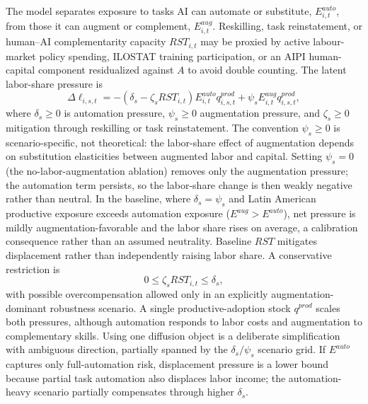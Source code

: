 \documentclass[11pt,a4paper]{article}
\begin{document}
The model separates exposure to tasks AI can automate or substitute, $E^{auto}_{i,t}$, from those it can augment or complement, $E^{aug}_{i,t}$. Reskilling, task reinstatement, or human--AI complementarity capacity $RST_{i,t}$ may be proxied by active labour-market policy spending, ILOSTAT training participation, or an AIPI human-capital component residualized against $A$ to avoid double counting. The latent labor-share pressure is
\begin{equation}
    \Delta \ell_{i,s,t}
    =
    -\left(\delta_s-\zeta_s RST_{i,t}\right)
    E^{auto}_{i,t}q^{prod}_{i,s,t}
    +
    \psi_s E^{aug}_{i,t}q^{prod}_{i,s,t},
\end{equation}
where $\delta_s\geq0$ is automation pressure, $\psi_s\geq0$ augmentation pressure, and $\zeta_s\geq0$ mitigation through reskilling or task reinstatement. The convention $\psi_s\geq0$ is scenario-specific, not theoretical: the labor-share effect of augmentation depends on substitution elasticities between augmented labor and capital. Setting $\psi_s=0$ (the no-labor-augmentation ablation) removes only the augmentation pressure; the automation term persists, so the labor-share change is then weakly negative rather than neutral. In the baseline, where $\delta_s=\psi_s$ and Latin American productive exposure exceeds automation exposure ($E^{aug}>E^{auto}$), net pressure is mildly augmentation-favorable and the labor share rises on average, a calibration consequence rather than an assumed neutrality. Baseline $RST$ mitigates displacement rather than independently raising labor share. A conservative restriction is
\begin{equation}
    0\leq \zeta_s RST_{i,t}\leq \delta_s,
\end{equation}
with possible overcompensation allowed only in an explicitly augmentation-dominant robustness scenario.
A single productive-adoption stock $q^{prod}$ scales both pressures, although automation responds to labor costs and augmentation to complementary skills. Using one diffusion object is a deliberate simplification with ambiguous direction, partially spanned by the $\delta_s/\psi_s$ scenario grid. If $E^{auto}$ captures only full-automation risk, displacement pressure is a lower bound because partial task automation also displaces labor income; the automation-heavy scenario partially compensates through higher $\delta_s$.
\end{document}
